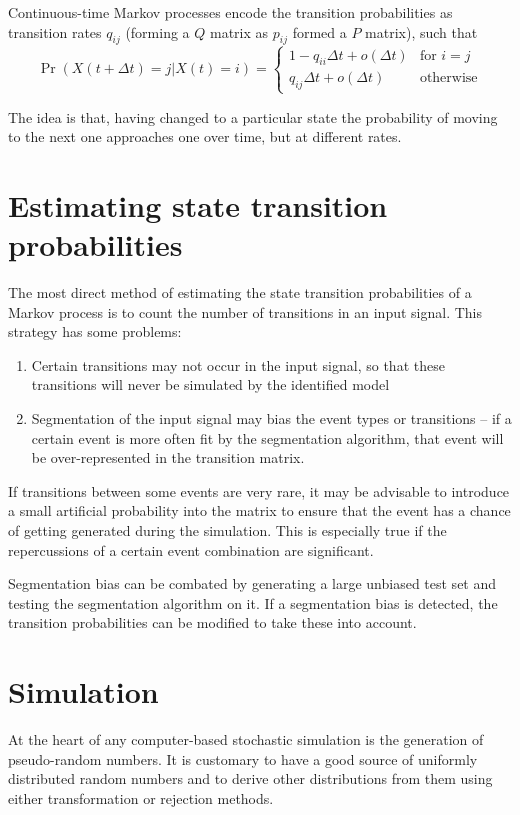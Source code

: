 Continuous-time Markov processes encode the transition probabilities as
transition rates $q_{ij}$ (forming a $Q$ matrix as $p_{ij}$ formed a
$P$ matrix), such that
\begin{equation}
  \label{eq:contmarkov}
  \Pr(X(t+\Delta t) = j | X(t) = i) = 
  \begin{cases}
    1 - q_{ii}\Delta t + o(\Delta t) & \text{for } i = j \\
    q_{ij}\Delta t + o(\Delta t) & \text{otherwise}
  \end{cases}
\end{equation}

The idea is that, having changed to a particular state the probability of moving to the next one approaches one over time, but at different rates.

\section{Estimating state transition probabilities}
The most direct method of estimating the state transition probabilities of a Markov process is to count the number of transitions in an input signal.
This strategy has some problems:
\begin{enumerate}
\item Certain transitions may not occur in the input signal, so that these transitions will never be simulated by the identified model
\item Segmentation of the input signal may bias the event types or transitions -- if a certain event is more often fit by the segmentation algorithm, that event will be over-represented in the transition matrix.
\end{enumerate}

If transitions between some events are very rare, it may be advisable to introduce a small artificial probability into the matrix to ensure that the event has a chance of  getting generated during the simulation.
This is especially true if the repercussions of a certain event combination are significant.  

Segmentation bias can be combated by generating a large unbiased test set and testing the segmentation algorithm on it.
If a segmentation bias is detected, the transition probabilities can be modified to take these into account.

\section{Simulation}
At the heart of any computer-based stochastic simulation is the
generation of pseudo-random numbers.  It is customary to have a good
source of uniformly distributed random numbers and to derive other
distributions from them using either transformation or rejection
methods.


